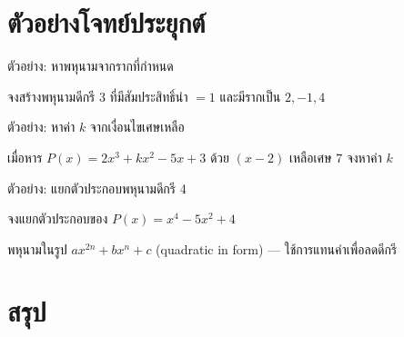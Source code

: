\documentclass[11pt, aspectratio=169]{beamer}
\begin{document}
\section{ตัวอย่างโจทย์ประยุกต์}

\begin{frame}[t]{ตัวอย่าง: หาพหุนามจากรากที่กำหนด}
  \begin{exambox}[โจทย์]
    จงสร้างพหุนามดีกรี $3$ ที่มีสัมประสิทธิ์นำ $= 1$ และมีรากเป็น $2, -1, 4$
  \end{exambox}
  \vspace{\fill}


\end{frame}

\begin{frame}[t]{ตัวอย่าง: หาค่า $k$ จากเงื่อนไขเศษเหลือ}
  \begin{exambox}[โจทย์]
    เมื่อหาร $P(x) = 2x^3 + kx^2 - 5x + 3$ ด้วย $(x-2)$ เหลือเศษ $7$
    จงหาค่า $k$
  \end{exambox}
  \vspace{\fill}


\end{frame}

\begin{frame}[t]{ตัวอย่าง: แยกตัวประกอบพหุนามดีกรี 4}
  \begin{exambox}[โจทย์]
    จงแยกตัวประกอบของ $P(x) = x^4 - 5x^2 + 4$
  \end{exambox}
  \vspace{\fill}


  \begin{intuition}[เทคนิค]
    พหุนามในรูป $ax^{2n} + bx^n + c$ (quadratic in form) — ใช้การแทนค่าเพื่อลดดีกรี
  \end{intuition}

\end{frame}

\section{สรุป}
\end{document}
